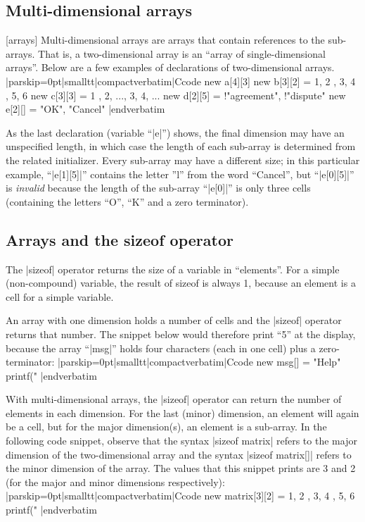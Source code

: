 \subsection{Multi-dimensional arrays}
  [arrays]
Multi-dimensional arrays are arrays that contain references to the
sub-arrays. That is, a two-dimensional
array is an ``array of single-dimensional arrays''. Below are a few examples
of declarations of two-dimensional arrays.
\listingx\verbatim|parskip=0pt|smalltt|compactverbatim|Ccode
new a[4][3]
new b[3][2] = { { 1, 2 }, { 3, 4 }, { 5, 6 } }
new c[3][3] = { { 1 }, { 2, ...}, { 3, 4, ... } }
new d[2][5] = { !"agreement", !"dispute" }
new e[2][]  = { "OK", "Cancel" }
|endverbatim\endlistingx
\goodbreak

As the last declaration (variable ``|e|'') shows, the final dimension may have
an unspecified length, in which case the length of each sub-array is determined
from the related initializer. Every sub-array may have a different size; in
this particular example, ``|e[1][5]|'' contains the letter ''l'' from the word
``Cancel'', but ``|e[0][5]|'' is {\it invalid\/} because the length of the
sub-array ``|e[0]|'' is only three cells (containing the letters ``O'', ``K''
and a zero terminator).


\subsection{Arrays and the sizeof operator}
The |sizeof| operator returns the size of a variable in ``elements''. For a simple
(non-compound) variable, the result of sizeof is always 1, because an element is
a cell for a simple variable.

An array with one dimension holds a number of cells and the |sizeof| operator
returns that number. The snippet below would therefore print ``5'' at the
display, because the array ``|msg|'' holds four characters (each in one cell)
plus a zero-terminator:
\listingx\verbatim|parskip=0pt|smalltt|compactverbatim|Ccode
new msg[] = "Help"
printf("%
|endverbatim\endlistingx
\goodbreak

With multi-dimensional arrays, the |sizeof| operator can return the number of
elements in each dimension. For the last (minor) dimension, an element will
again be a cell, but for the major dimension(s), an element is a sub-array. In
the following code snippet, observe that the syntax |sizeof matrix| refers to
the major dimension of the two-dimensional array and the syntax |sizeof matrix[]|
refers to the minor dimension of the array. The values that this snippet prints
are 3 and 2 (for the major and minor dimensions respectively):
\listingx\verbatim|parskip=0pt|smalltt|compactverbatim|Ccode
new matrix[3][2] = { { 1, 2 }, { 3, 4 }, { 5, 6 } }
printf("%
|endverbatim\endlistingx
\goodbreak

